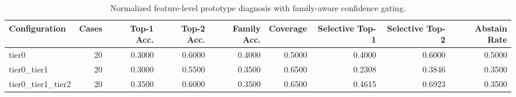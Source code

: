 \begin{table}[t]
\centering
\caption{Normalized feature-level prototype diagnosis with family-aware confidence gating.}
\label{tab:dice_stressor_hierarchical_diagnosis}
\footnotesize
\begin{tabular}{lrrrrrrrr}
\toprule
Configuration & Cases & Top-1 Acc. & Top-2 Acc. & Family Acc. & Coverage & Selective Top-1 & Selective Top-2 & Abstain Rate \\
\midrule
tier0 & 20 & 0.3000 & 0.6000 & 0.4000 & 0.5000 & 0.4000 & 0.6000 & 0.5000 \\
tier0_tier1 & 20 & 0.3000 & 0.5500 & 0.3500 & 0.6500 & 0.2308 & 0.3846 & 0.3500 \\
tier0_tier1_tier2 & 20 & 0.3500 & 0.6000 & 0.3500 & 0.6500 & 0.4615 & 0.6923 & 0.3500 \\
\bottomrule
\end{tabular}

\end{table}
